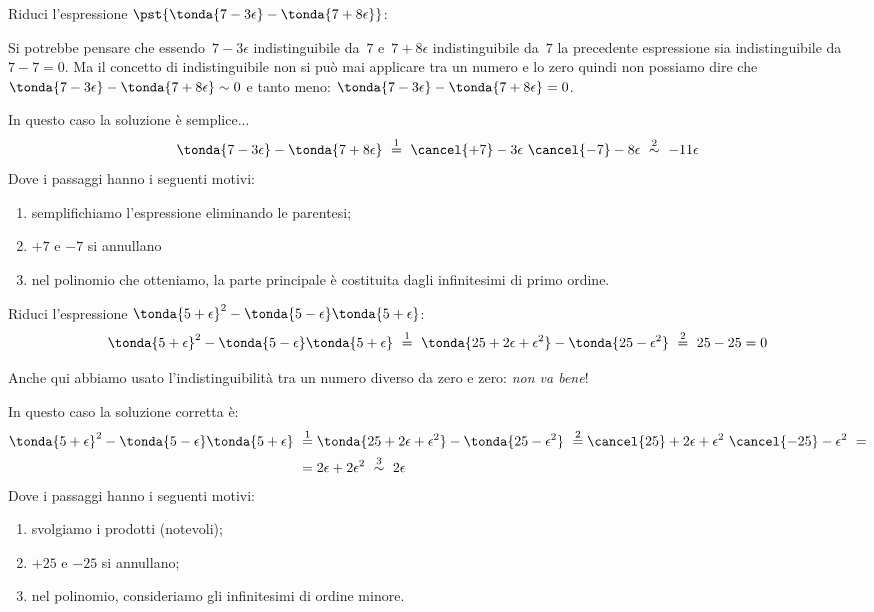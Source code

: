 \begin{esempio}
Riduci l'espressione \quad 
\(\pst{\tonda{7 -3\epsilon} - \tonda{7 +8\epsilon}}\):

\begin{osservazione}
 Si potrebbe pensare che essendo~\(7 -3\epsilon\) indistinguibile da~\(7\) 
e~\(7 +8\epsilon\) indistinguibile da~\(7\) la precedente espressione 
sia indistinguibile da \(7 - 7 = 0\).
Ma il concetto di indistinguibile non si può mai applicare tra un numero e 
lo zero quindi non possiamo dire che 
\(\tonda{7 -3\epsilon} - \tonda{7 +8\epsilon} \sim 0\) e 
tanto meno: \(\tonda{7 -3\epsilon} - \tonda{7 +8\epsilon} = 0\).
\end{osservazione}

In questo caso la soluzione è semplice...
\[\tonda{7 -3\epsilon} - \tonda{7 +8\epsilon}
~ \stackrel{1}{=} ~
   \cancel{+7} -3\epsilon ~ \cancel{-7} -8\epsilon 
~ \stackrel{2}{\sim} ~
   -11 \epsilon\]
Dove i passaggi hanno i seguenti motivi:
\begin{enumerate} [nosep]
 \item semplifichiamo l'espressione eliminando le parentesi; 
 \item \(+7\) e \(-7\) si annullano
 \item nel polinomio che otteniamo, la parte principale è costituita dagli 
infinitesimi di primo ordine.
\end{enumerate}
\end{esempio}

\begin{esempio}
Riduci l'espressione \quad 
\(\tonda{5 +\epsilon}^2 - \tonda{5 -\epsilon}\tonda{5 +\epsilon}\):
\[\tonda{5 +\epsilon}^2 - \tonda{5 -\epsilon}\tonda{5 +\epsilon}
~ \stackrel{1}{=} ~
\tonda{25 +2\epsilon+\epsilon^2} - \tonda{25 -\epsilon^2}
~ \stackrel{2}{=} ~
25 - 25 = 0
\]
\begin{osservazione}
Anche qui abbiamo usato l'indistinguibilità tra un numero diverso da zero 
e zero: \emph{non va bene}!
\end{osservazione}

In questo caso la soluzione corretta è:
\begin{align*}
\tonda{5 +\epsilon}^2 - \tonda{5 -\epsilon}\tonda{5 +\epsilon}
~ &\stackrel{1}{=} 
\tonda{25 +2\epsilon+\epsilon^2} - \tonda{25 -\epsilon^2}
~ \stackrel{2}{=} 
\cancel{25} +2\epsilon+\epsilon^2 ~ \cancel{-25} -\epsilon^2
~ = \\
&= 2\epsilon+2\epsilon^2 
~ \stackrel{3}{\sim} ~
2\epsilon
\end{align*}
Dove i passaggi hanno i seguenti motivi:
\begin{enumerate} [nosep]
 \item svolgiamo i prodotti (notevoli); 
 \item \(+25\) e \(-25\) si annullano; 
 \item nel polinomio, consideriamo gli infinitesimi di ordine minore.
\end{enumerate}
\end{esempio}

